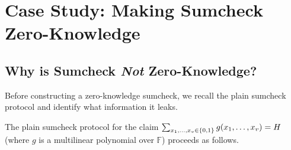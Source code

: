 \documentclass[11pt]{article}
\begin{document}
\section{Case Study: Making Sumcheck Zero-Knowledge}

\subsection{Why is Sumcheck \emph{Not} Zero-Knowledge?}

Before constructing a zero-knowledge sumcheck, we recall the plain
sumcheck protocol and identify what information it leaks.

\medskip
\noindent The plain sumcheck protocol for the claim
$\sum_{x_1,\ldots,x_v \in \{0,1\}} g(x_1,\ldots,x_v) = H$
(where $g$ is a multilinear polynomial over $\mathbb{F}$) proceeds as
follows.
\end{document}
